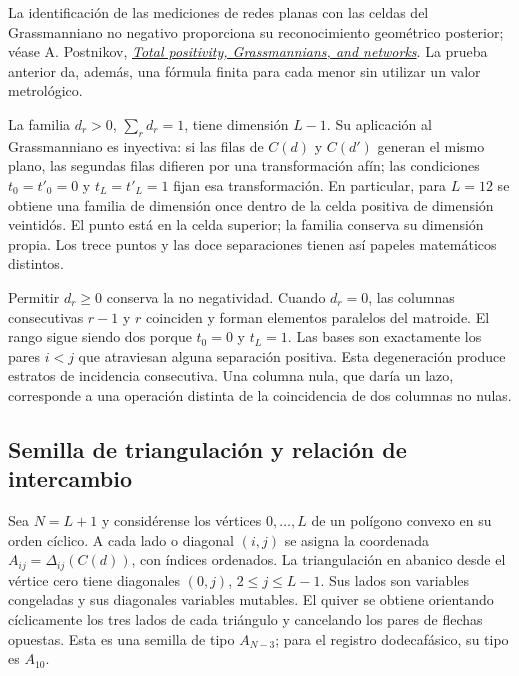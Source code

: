 La identificación de las mediciones de redes planas con las celdas del
Grassmanniano no negativo proporciona su reconocimiento geométrico posterior;
véase A. Postnikov,
\href{https://arxiv.org/abs/math/0609764}{\emph{Total positivity,
Grassmannians, and networks}}. La prueba anterior da, además, una fórmula
finita para cada menor sin utilizar un valor metrológico.

La familia \(d_r>0\), \(\sum_rd_r=1\), tiene dimensión \(L-1\).
Su aplicación al Grassmanniano es inyectiva: si las filas de \(C(d)\) y
\(C(d')\) generan el mismo plano, las segundas filas difieren por una
transformación afín; las condiciones \(t_0=t'_0=0\) y
\(t_L=t'_L=1\) fijan esa transformación. En particular, para \(L=12\)
se obtiene una familia de dimensión once dentro de la celda positiva de
dimensión veintidós. El punto está en la celda superior; la familia conserva
su dimensión propia. Los trece puntos y las doce separaciones tienen así
papeles matemáticos distintos.

Permitir \(d_r\ge0\) conserva la no negatividad. Cuando \(d_r=0\), las
columnas consecutivas \(r-1\) y \(r\) coinciden y forman elementos
paralelos del matroide. El rango sigue siendo dos porque \(t_0=0\) y
\(t_L=1\). Las bases son exactamente los pares \(i<j\) que atraviesan
alguna separación positiva. Esta degeneración produce estratos de incidencia
consecutiva. Una columna nula, que daría un lazo, corresponde a una operación
distinta de la coincidencia de dos columnas no nulas.

\subsection{Semilla de triangulación y relación de intercambio}

Sea \(N=L+1\) y considérense los vértices \(0,\ldots,L\) de un polígono
convexo en su orden cíclico. A cada lado o diagonal \((i,j)\) se asigna
la coordenada \(A_{ij}=\Delta_{ij}(C(d))\), con índices ordenados.
La triangulación en abanico desde el vértice cero tiene diagonales
\((0,j)\), \(2\le j\le L-1\). Sus lados son variables congeladas y
sus diagonales variables mutables. El quiver se obtiene orientando
cíclicamente los tres lados de cada triángulo y cancelando los pares de
flechas opuestas. Esta es una semilla de tipo \(A_{N-3}\); para el registro
dodecafásico, su tipo es \(A_{10}\).

